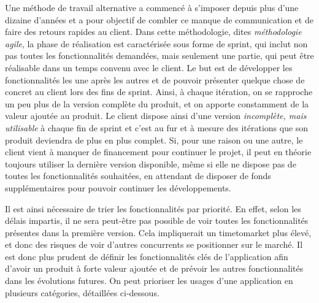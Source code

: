 Une méthode de travail alternative a commencé à s'imposer depuis plus d'une dizaine d'années et a pour objectif de combler ce manque de communication et de faire des retours rapides au client. Dans cette méthodologie, dites \emph{méthodologie agile}, la phase de réalisation est caractérisée sous forme de sprint, qui inclut non pas toutes les fonctionnalités demandées, mais seulement une partie, qui peut être réalisable dans un temps convenu avec le client. Le but est de développer les fonctionnalités les une après les autres et de pouvoir présenter quelque chose de concret au client lors des fins de sprint. Ainsi, à chaque itération, on se rapproche un peu plus de la version complète du produit, et on apporte constamment de la valeur ajoutée au produit. Le client dispose ainsi d'une version \emph{incomplète, mais utilisable} à chaque fin de sprint et c'est au fur et à mesure des itérations que son produit deviendra de plus en plus complet. Si, pour une raison ou une autre, le client vient à manquer de financement pour continuer le projet, il peut en théorie toujours utiliser la dernière version disponible, même si elle ne dispose pas de toutes les fonctionnalités souhaitées, en attendant de disposer de fonds supplémentaires pour pouvoir continuer les développements.

Il est ainsi nécessaire de trier les fonctionnalités par priorité. En effet, selon les délais impartis, il ne sera peut-être pas possible de voir toutes les fonctionnalités présentes dans la première version. Cela impliquerait un \gls{timetomarket} plus élevé, et donc des risques de voir d'autres concurrents se positionner sur le marché. Il est donc plus prudent de définir les fonctionnalités clés de l'application afin d'avoir un produit à forte valeur ajoutée et de prévoir les autres fonctionnalités dans les évolutions futures. On peut prioriser les usages d'une application en plusieurs catégories, détaillées ci-dessous.

